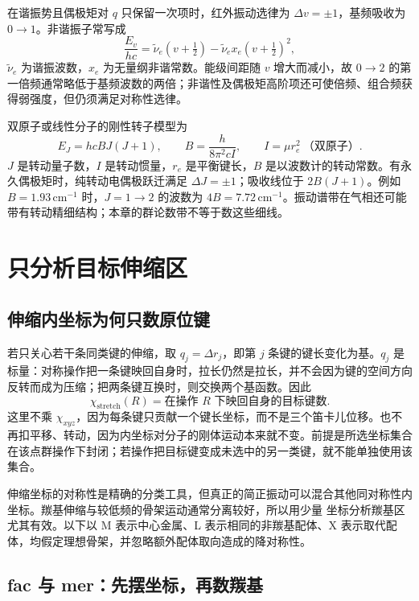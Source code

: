 在谐振势且偶极矩对 $q$ 只保留一次项时，红外振动选律为 $\Delta v=\pm1$，基频吸收为 $0\to1$。非谐振子常写成
\[
\frac{E_v}{hc}=\widetilde\nu_e\left(v+\tfrac12\right)
-\widetilde\nu_e x_e\left(v+\tfrac12\right)^2,
\]
$\widetilde\nu_e$ 为谐振波数，$x_e$ 为无量纲非谐常数。能级间距随 $v$ 增大而减小，故 $0\to2$ 的第一倍频通常略低于基频波数的两倍；非谐性及偶极矩高阶项还可使倍频、组合频获得弱强度，但仍须满足对称性选律。

双原子或线性分子的刚性转子模型为
\[
E_J=hcB J(J+1),\qquad B=\frac{h}{8\pi^2cI},
\qquad I=\mu r_e^2\ \text{（双原子）}.
\]
$J$ 是转动量子数，$I$ 是转动惯量，$r_e$ 是平衡键长，$B$ 是以波数计的转动常数。有永久偶极矩时，纯转动电偶极跃迁满足 $\Delta J=\pm1$；吸收线位于 $2B(J+1)$。例如 $B=1.93\,\mathrm{cm}^{-1}$ 时，$J=1\to2$ 的波数为 $4B=7.72\,\mathrm{cm}^{-1}$。振动谱带在气相还可能带有转动精细结构；本章的群论数带不等于数这些细线。

\section{只分析目标伸缩区}
\label{sec:stretching-applications}

\subsection{伸缩内坐标为何只数原位键}

若只关心若干条同类键的伸缩，取 $q_j=\Delta r_j$，即第 $j$ 条键的键长变化为基。$q_j$ 是标量：对称操作把一条键映回自身时，拉长仍然是拉长，并不会因为键的空间方向反转而成为压缩；把两条键互换时，则交换两个基函数。因此
\[
\chi_{\mathrm{stretch}}(R)=\text{在操作 $R$ 下映回自身的目标键数}.
\]
这里不乘 $\chi_{xyz}$，因为每条键只贡献一个键长坐标，而不是三个笛卡儿位移。也不再扣平移、转动，因为内坐标对分子的刚体运动本来就不变。前提是所选坐标集合在该点群操作下封闭；若操作把目标键变成未选中的另一类键，就不能单独使用该集合。

伸缩坐标的对称性是精确的分类工具，但真正的简正振动可以混合其他同对称性内坐标。羰基伸缩与较低频的骨架运动通常分离较好，所以用少量  坐标分析羰基区尤其有效。以下以 M 表示中心金属、L 表示相同的非羰基配体、X 表示取代配体，均假定理想骨架，并忽略额外配体取向造成的降对称性。

\subsection{fac 与 mer：先摆坐标，再数羰基}

